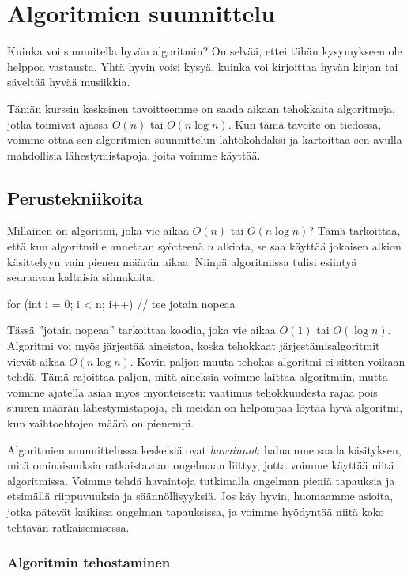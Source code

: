 \chapter{Algoritmien suunnittelu}

Kuinka voi suunnitella hyvän algoritmin?
On selvää, ettei tähän kysymykseen ole helppoa vastausta.
Yhtä hyvin voisi kysyä, kuinka voi kirjoittaa hyvän kirjan
tai säveltää hyvää musiikkia.

Tämän kurssin keskeinen tavoitteemme on saada aikaan tehokkaita algoritmeja,
jotka toimivat ajassa $O(n)$ tai $O(n \log n)$.
Kun tämä tavoite on tiedossa, voimme ottaa sen algoritmien
suunnittelun lähtökohdaksi ja kartoittaa sen avulla mahdollisia
lähestymistapoja, joita voimme käyttää.

\section{Perustekniikoita}

Millainen on algoritmi, joka vie aikaa $O(n)$ tai $O(n \log n)$?
Tämä tarkoittaa,
että kun algoritmille annetaan syötteenä $n$ alkiota,
se saa käyttää jokaisen alkion käsittelyyn
vain pienen määrän aikaa.
Niinpä algoritmissa tulisi esiintyä seuraavan kaltaisia silmukoita:

\begin{code}
for (int i = 0; i < n; i++) {
    // tee jotain nopeaa
}
\end{code}

Tässä ''jotain nopeaa'' tarkoittaa koodia, joka vie aikaa
$O(1)$ tai $O(\log n)$.
Algoritmi voi myös järjestää aineistoa,
koska tehokkaat järjestämisalgoritmit vievät aikaa $O(n \log n)$.
Kovin paljon muuta tehokas algoritmi ei sitten voikaan tehdä.
Tämä rajoittaa paljon, mitä aineksia voimme laittaa algoritmiin,
mutta voimme ajatella asiaa myös myönteisesti:
vaatimus tehokkuudesta rajaa pois suuren määrän lähestymistapoja,
eli meidän on helpompaa löytää hyvä algoritmi,
kun vaihtoehtojen määrä on pienempi.

Algoritmien suunnittelussa keskeisiä ovat \emph{havainnot}:
haluamme saada käsityksen,
mitä ominaisuuksia ratkaistavaan ongelmaan liittyy,
jotta voimme käyttää niitä algoritmissa.
Voimme tehdä havaintoja tutkimalla ongelman pieniä tapauksia
ja etsimällä riippuvuuksia ja säännöllisyyksiä.
Jos käy hyvin, huomaamme asioita, jotka pätevät kaikissa ongelman
tapauksissa, ja voimme hyödyntää niitä koko tehtävän ratkaisemisessa.

\subsection{Algoritmin tehostaminen}

